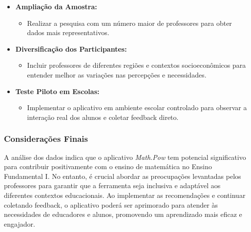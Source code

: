 \begin{itemize}
    \item \textbf{Ampliação da Amostra:}
    \begin{itemize}
        \item Realizar a pesquisa com um número maior de professores para obter dados mais representativos.
    \end{itemize}
    \item \textbf{Diversificação dos Participantes:}
    \begin{itemize}
        \item Incluir professores de diferentes regiões e contextos socioeconômicos para entender melhor as variações nas percepções e necessidades.
    \end{itemize}
    \item \textbf{Teste Piloto em Escolas:}
    \begin{itemize}
        \item Implementar o aplicativo em ambiente escolar controlado para observar a interação real dos alunos e coletar feedback direto.
    \end{itemize}
\end{itemize}

\subsubsection{Considerações Finais}

A análise dos dados indica que o aplicativo \textit{Math.Pow} tem potencial significativo para contribuir positivamente com o ensino de matemática no Ensino Fundamental I. No entanto, é crucial abordar as preocupações levantadas pelos professores para garantir que a ferramenta seja inclusiva e adaptável aos diferentes contextos educacionais. Ao implementar as recomendações e continuar coletando feedback, o aplicativo poderá ser aprimorado para atender às necessidades de educadores e alunos, promovendo um aprendizado mais eficaz e engajador.
